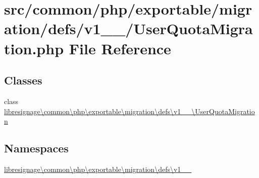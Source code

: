 \hypertarget{v1__1__0_2UserQuotaMigration_8php}{}\section{src/common/php/exportable/migration/defs/v1\+\_\+\_/\+User\+Quota\+Migration.php File Reference}
\label{v1__1__0_2UserQuotaMigration_8php}
\subsection*{Classes}
\begin{DoxyCompactItemize}
\item 
class \hyperlink{classlibresignage_1_1common_1_1php_1_1exportable_1_1migration_1_1defs_1_1v1__1__0_1_1UserQuotaMigration}{libresignage\textbackslash{}common\textbackslash{}php\textbackslash{}exportable\textbackslash{}migration\textbackslash{}defs\textbackslash{}v1\+\_\+\_\textbackslash{}\+User\+Quota\+Migration}
\end{DoxyCompactItemize}
\subsection*{Namespaces}
\begin{DoxyCompactItemize}
\item 
 \hyperlink{namespacelibresignage_1_1common_1_1php_1_1exportable_1_1migration_1_1defs_1_1v1__1__0}{libresignage\textbackslash{}common\textbackslash{}php\textbackslash{}exportable\textbackslash{}migration\textbackslash{}defs\textbackslash{}v1\+\_\+\_}
\end{DoxyCompactItemize}
